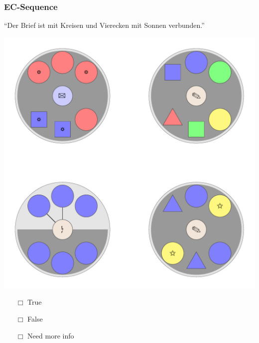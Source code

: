 \documentclass[fleqn,10pt,xcolor=dvipsnames]{beamer}
\newcommand{\EC}{EC\xspace}
\newcommand{\mymark}[1]{{\color{mycol}{#1}}}
\begin{document}
\begin{frame}
  \frametitle{\EC-Sequence}
  \begin{center}
    ``Der Brief ist mit Kreisen und Vierecken mit Sonnen verbunden.''

    \vspace{0.1cm}

    \includegraphics[width=0.5 \textwidth]{../../pictures/ec_01_2.pdf}

    \vspace{0.1cm}

    \begin{multicols}{3}
      \begin{itemize} 
      \item[$\Box$] True\\
        \onslide<2>{$\leadsto$  \mymark{false}}
      \item[$\Box$] False\\
        \onslide<2>{$\leadsto$ \mymark{false}}
      \item[$\Box$] Need more info 
      \end{itemize}
    \end{multicols}

  \end{center}
\end{frame}
\end{document}
